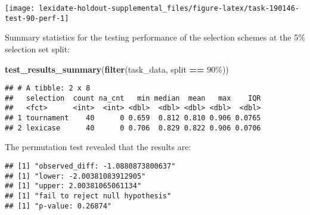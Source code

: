 \documentclass[
]{book}
\newenvironment{Shaded}{\begin{snugshade}}{\end{snugshade}}
\newcommand{\AttributeTok}[1]{\textcolor[rgb]{0.13,0.29,0.53}{#1}}
\newcommand{\DecValTok}[1]{\textcolor[rgb]{0.00,0.00,0.81}{#1}}
\newcommand{\FunctionTok}[1]{\textcolor[rgb]{0.13,0.29,0.53}{\textbf{#1}}}
\newcommand{\NormalTok}[1]{#1}
\newcommand{\OtherTok}[1]{\textcolor[rgb]{0.56,0.35,0.01}{#1}}
\newcommand{\SpecialCharTok}[1]{\textcolor[rgb]{0.81,0.36,0.00}{\textbf{#1}}}
\newcommand{\StringTok}[1]{\textcolor[rgb]{0.31,0.60,0.02}{#1}}
\begin{document}
\texttt{[image: lexidate-holdout-supplemental\_files/figure-latex/task-190146-test-90-perf-1]}

Summary statistics for the testing performance of the selection schemes at the 5\% selection set split:

\begin{Shaded}
\begin{Highlighting}[]
\FunctionTok{test\_results\_summary}\NormalTok{(}\FunctionTok{filter}\NormalTok{(task\_data, split }\SpecialCharTok{==} \StringTok{\textquotesingle{}90\%\textquotesingle{}}\NormalTok{))}
\end{Highlighting}
\end{Shaded}

\begin{verbatim}
## # A tibble: 2 x 8
##   selection  count na_cnt   min median  mean   max    IQR
##   <fct>      <int>  <int> <dbl>  <dbl> <dbl> <dbl>  <dbl>
## 1 tournament    40      0 0.659  0.812 0.810 0.906 0.0765
## 2 lexicase      40      0 0.706  0.829 0.822 0.906 0.0706
\end{verbatim}

The permutation test revealed that the results are:

\begin{Shaded}
\end{Shaded}

\begin{verbatim}
## [1] "observed_diff: -1.0880873800637"
## [1] "lower: -2.00381083912905"
## [1] "upper: 2.00381065061134"
## [1] "fail to reject null hypothesis"
## [1] "p-value: 0.26874"
\end{verbatim}
\end{document}
